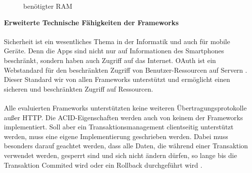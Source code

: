 \begin{figure} [ht]
	\centering
	 \qquad
	 \qquad
	 \qquad
	\caption{benötigter RAM} 
	\label{ramB}
\end{figure} 
\newpage
{\large \textbf{Erweiterte Technische Fähigkeiten der Frameworks}}\\\\
Sicherheit ist ein wesentliches Thema in der Informatik und auch für mobile Geräte. Denn die Apps sind nicht nur auf Informationen des Smartphones beschränkt, sondern haben auch Zugriff auf das Internet. OAuth ist ein Webstandard für den beschränkten Zugriff von Benutzer-Ressourcen auf Servern \cite{shehab:secure}. Dieser Standard wir von allen Frameworks unterstützt und ermöglicht einen sicheren und beschränkten Zugriff auf Ressourcen. 
\\\\
Alle evaluierten Frameworks unterstützten keine weiteren Übertragungsprotokolle außer HTTP. Die ACID-Eigenschaften werden auch von keinem der Frameworks implementiert. Soll aber ein Transaktionsmanagement clientseitig unterstützt werden, muss eine eigene Implementierung geschrieben werden. Dabei muss besonders darauf geachtet werden, dass alle Daten, die während einer Transaktion verwendet werden, gesperrt sind und sich nicht ändern dürfen, so lange bis die Transaktion Commited wird oder ein Rollback durchgeführt wird \cite{braun:Transaktionen}.

